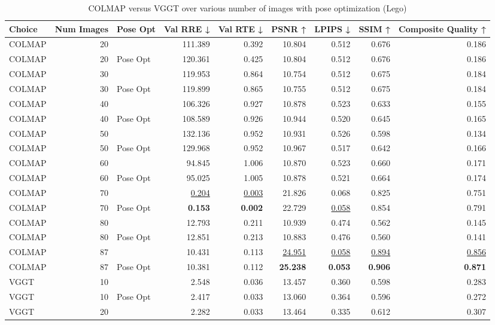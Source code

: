 \begin{table}[H]
\caption{COLMAP versus VGGT over various number of images with pose optimization (Lego)}
\label{tab:01_num_images_pose_opt_lego}
\small
\begin{tabular}{lrlrrrrrr}
\toprule
Choice & Num Images & Pose Opt & Val RRE ↓ & Val RTE ↓ & PSNR ↑ & LPIPS ↓ & SSIM ↑ & Composite Quality ↑ \\
\midrule
COLMAP & 20 &  & 111.389 & 0.392 & 10.804 & 0.512 & 0.676 & 0.186 \\
COLMAP & 20 & Pose Opt & 120.361 & 0.425 & 10.804 & 0.512 & 0.676 & 0.186 \\
COLMAP & 30 &  & 119.953 & 0.864 & 10.754 & 0.512 & 0.675 & 0.184 \\
COLMAP & 30 & Pose Opt & 119.899 & 0.865 & 10.755 & 0.512 & 0.675 & 0.184 \\
COLMAP & 40 &  & 106.326 & 0.927 & 10.878 & 0.523 & 0.633 & 0.155 \\
COLMAP & 40 & Pose Opt & 108.589 & 0.926 & 10.944 & 0.520 & 0.645 & 0.165 \\
COLMAP & 50 &  & 132.136 & 0.952 & 10.931 & 0.526 & 0.598 & 0.134 \\
COLMAP & 50 & Pose Opt & 129.968 & 0.952 & 10.967 & 0.517 & 0.642 & 0.166 \\
COLMAP & 60 &  & 94.845 & 1.006 & 10.870 & 0.523 & 0.660 & 0.171 \\
COLMAP & 60 & Pose Opt & 95.025 & 1.005 & 10.878 & 0.521 & 0.664 & 0.174 \\
COLMAP & 70 &  & \underline{0.204} & \underline{0.003} & 21.826 & 0.068 & 0.825 & 0.751 \\
COLMAP & 70 & Pose Opt & \textbf{0.153} & \textbf{0.002} & 22.729 & \underline{0.058} & 0.854 & 0.791 \\
COLMAP & 80 &  & 12.793 & 0.211 & 10.939 & 0.474 & 0.562 & 0.145 \\
COLMAP & 80 & Pose Opt & 12.851 & 0.213 & 10.883 & 0.476 & 0.560 & 0.141 \\
COLMAP & 87 &  & 10.431 & 0.113 & \underline{24.951} & \underline{0.058} & \underline{0.894} & \underline{0.856} \\
COLMAP & 87 & Pose Opt & 10.381 & 0.112 & \textbf{25.238} & \textbf{0.053} & \textbf{0.906} & \textbf{0.871} \\
VGGT & 10 &  & 2.548 & 0.036 & 13.457 & 0.360 & 0.598 & 0.283 \\
VGGT & 10 & Pose Opt & 2.417 & 0.033 & 13.060 & 0.364 & 0.596 & 0.272 \\
VGGT & 20 &  & 2.282 & 0.033 & 13.464 & 0.335 & 0.612 & 0.307 \\

\end{tabular}
\end{table}
